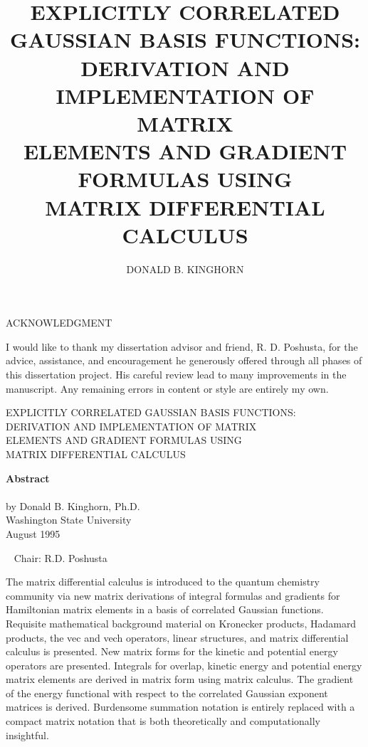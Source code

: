 \documentclass[12pt,thmsa,suthesis,verbatim]{report}
\begin{document}
\title{EXPLICITLY CORRELATED GAUSSIAN BASIS FUNCTIONS:\\
DERIVATION AND IMPLEMENTATION OF MATRIX \\
ELEMENTS AND GRADIENT FORMULAS USING \\
MATRIX DIFFERENTIAL CALCULUS}
\author{DONALD B. KINGHORN}





\copyrightfalse

\figurespagefalse

\beforepreface
{}

\begin{center}
{\large ACKNOWLEDGMENT}
\end{center}


I would like to thank my dissertation advisor and friend, R. D. Poshusta,
for the advice, assistance, and encouragement he generously offered through
all phases of this dissertation project. His careful review lead to many
improvements in the manuscript. Any remaining errors in content or style are
entirely my own.


\begin{center}
{EXPLICITLY CORRELATED GAUSSIAN BASIS FUNCTIONS:\\DERIVATION AND
IMPLEMENTATION OF MATRIX \\ELEMENTS AND GRADIENT FORMULAS USING \\MATRIX
DIFFERENTIAL CALCULUS}

\textbf{Abstract} \\\ \\by Donald B. Kinghorn, Ph.D. \\[-0.9em]Washington
State University \\[-0.9em]August 1995
\end{center}

\ \newline
{\noindent Chair: R.D. Poshusta} \ \newline

The matrix differential calculus is introduced to the quantum chemistry
community via new matrix derivations of integral formulas and gradients for
Hamiltonian matrix elements in a basis of correlated Gaussian functions.
Requisite mathematical background material on Kronecker products, Hadamard
products, the vec and vech operators, linear structures, and matrix
differential calculus is presented. New matrix forms for the kinetic and
potential energy operators are presented. Integrals for overlap, kinetic
energy and potential energy matrix elements are derived in matrix form using
matrix calculus. The gradient of the energy functional with respect to the
correlated Gaussian exponent matrices is derived. Burdensome summation
notation is entirely replaced with a compact matrix notation that is both
theoretically and computationally insightful.
\end{document}
